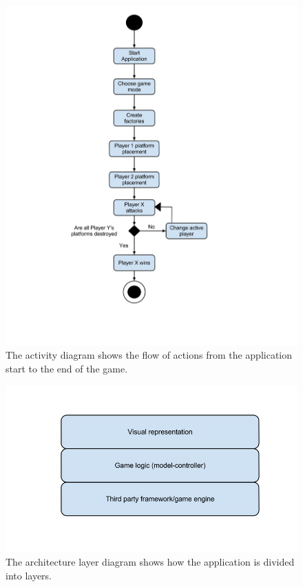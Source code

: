 \documentclass[12pt, a4paper]{article}
\begin{document}
\begin{figure}[H]
    \centering
    \includegraphics[width=\textwidth]{activity}
    \caption{The activity diagram shows the flow of actions from the application start to the end of the game.}
    \label{fig:activity}
\end{figure}

\begin{figure}[H]
    \centering
    \includegraphics[width=\textwidth]{arch}
    \caption{The architecture layer diagram shows how the application is divided into layers.
}
    \label{fig:arch}
\end{figure}
\end{document}
